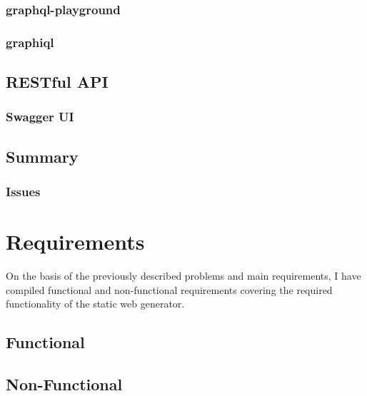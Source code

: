 \subsubsection{graphql-playground}

\subsubsection{graphiql}

\subsection{RESTful API}

\subsubsection{Swagger UI}

\subsection{Summary}

\subsubsection{Issues}


\section{Requirements}
On the basis of the previously described problems and main requirements, I have compiled functional and non-functional requirements covering the required functionality of the static web generator.

\subsection{Functional}


\subsection{Non-Functional}

